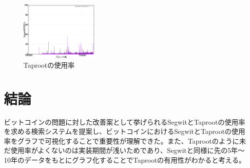 \documentclass[10pt,twocolumn, a4j]{jsarticle}
\makeatletter
\def\@biblabel#1{#1)}
\makeatother
\begin{document}
\vspace{-9mm}

\begin{figure}[h]
    \centering
    \includegraphics[width=0.35\textwidth]{taprootfigure.png}
    \caption{Taprootの使用率}
    \label{fig:taproot}
\end{figure}

\vspace{-5mm}



\section{結論}
ビットコインの問題に対した改善案として挙げられるSegwitとTaprootの使用率を求める検索システムを提案し、ビットコインにおけるSegwitとTaprootの使用率をグラフで可視化することで重要性が理解できた。また、Taprootのように未だ使用率がよくないのは実装期間が浅いためであり、Segwitと同様に先の5年〜10年のデータをもとにグラフ化することでTaprootの有用性がわかると考える。



\makeatletter
\def\@biblabel#1{#1)}
\makeatother






   
\end{document}
